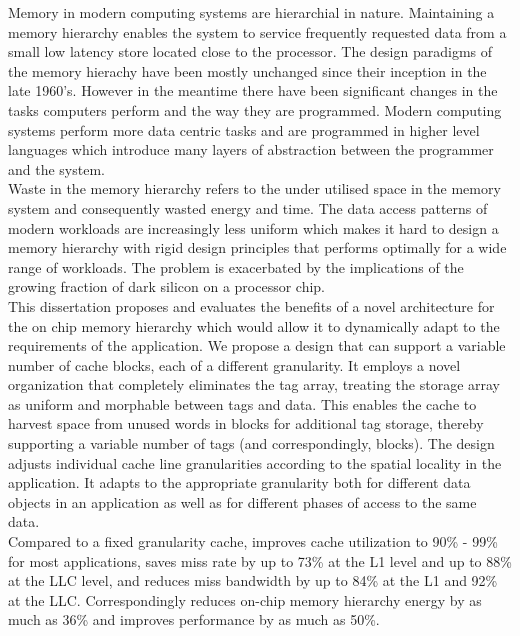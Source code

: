 
%
%


Memory in modern computing systems are hierarchial in
nature. Maintaining a memory hierarchy enables the system to service
frequently requested data from a small low latency store located close
to the processor. The design paradigms of the memory hierachy have
been mostly unchanged since their inception in the late
1960's. However in the meantime there have been significant changes in
the tasks computers perform and the way they are programmed. Modern
computing systems perform more data centric tasks and are programmed
in higher level languages which introduce many layers of abstraction
between the programmer and the system. \\ 

Waste in the memory hierarchy refers to the under utilised space in
the memory system and consequently wasted energy and time. The data
access patterns of modern workloads are increasingly less uniform
which makes it hard to design a memory hierarchy with rigid design
principles that performs optimally for a wide range of workloads.  The
problem is exacerbated by the implications of the growing fraction of
dark silicon on a processor chip. \\

This dissertation proposes and evaluates the benefits of a novel
architecture for the on chip memory hierarchy which would allow it to
dynamically adapt to the requirements of the application. We propose a
design that can support a variable number of cache blocks, each of a
different granularity. It employs a novel organization that completely
eliminates the tag array, treating the storage array as uniform and
morphable between tags and data.  This enables the cache to harvest
space from unused words in blocks for additional tag storage, thereby
supporting a variable number of tags (and correspondingly, blocks).
The design adjusts individual cache line granularities according to
the spatial locality in the application.  It adapts to the appropriate
granularity both for different data objects in an application as well
as for different phases of access to the same data. \\

Compared to a fixed granularity cache, improves cache utilization to
90\% - 99\% for most applications, saves miss rate by up to 73\% at
the L1 level and up to 88\% at the LLC level, and reduces miss
bandwidth by up to 84\% at the L1 and 92\% at the LLC. Correspondingly
reduces on-chip memory hierarchy energy by as much as 36\% and
improves performance by as much as 50\%.
